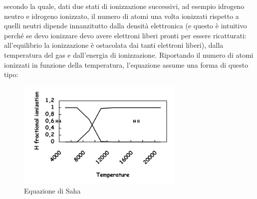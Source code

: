 \documentclass[a4paper,11pt]{article}
\begin{document}
    secondo la quale, dati due stati di ionizzazione successivi, ad esempio idrogeno neutro e idrogeno ionizzato, il numero di atomi una volta ionizzati rispetto a quelli neutri dipende innanzitutto dalla densità elettronica (e questo è intuitivo perché se devo ionizzare devo avere elettroni liberi pronti per essere ricatturati: all'equilibrio la ionizzazione è ostacolata dai tanti elettroni liberi), dalla temperatura del gas e dall'energia di ionizzazione.
    Riportando il numero di atomi ionizzati in funzione della temperatura, l'equazione assume una forma di questo tipo:
    
    \begin{figure}[h!!]
        \centering
        \includegraphics[width=8cm]{Saha_equation.jpg}
        \caption{Equazione di Saha}
        \label{fig: saha equation }
      \end{figure}
    
\end{document}
